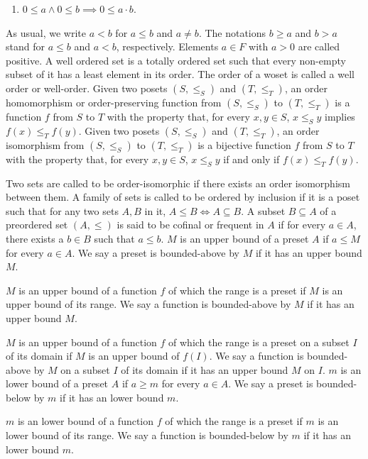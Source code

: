 \documentclass[a4paper,12pt]{article}
\begin{document}
{{{\begin{enumerate}
\item $0\leq a\land 0\leq b\implies 0\leq a\cdot b$.
\end{enumerate}
As usual, we write $a<b$ for $a\leq b$ and $a\neq b$. The notations $b\geq a$ and $b>a$ stand for $a\leq b$ and $a<b$, respectively. Elements $a\in F$ with $a>0$ are called positive.
A well ordered set is a totally ordered set such that every non-empty subset of it has a least element in its order. The order of a woset is called a well order or well-order.
Given two posets $(S,\leq _{S})$ and $(T,\leq _{T})$, an order homomorphism or order-preserving function from $(S,\leq _{S})$ to $(T,\leq _{T})$ is a function $f$ from $S$ to $T$ with the property that, for every $x,y\in S$, $x \leq_S y$ implies $f(x)\leq _{T}f(y)$.
Given two posets $(S,\leq _{S})$ and $(T,\leq _{T})$, an order isomorphism from $(S,\leq _{S})$ to $(T,\leq _{T})$ is a bijective function $f$ from $S$ to $T$ with the property that, for every $x,y\in S$, $x \leq_S y$ if and only if $f(x)\leq _{T}f(y)$.

Two sets are called to be order-isomorphic if there exists an order isomorphism between them.
A family of sets is called to be ordered by inclusion if it is a poset such that for any two sets $A,B$ in it, $A\leq B\iff A\subseteq B$.
A subset $B\subseteq A$ of a preordered set $(A,\leq )$ is said to be cofinal or frequent in $A$ if for every $a\in A$, there exists a $b\in B$ such that $a\leq b$.
$M$ is an upper bound of a preset $A$ if $a\leq M$ for every $a\in A$. We say a preset is bounded-above by $M$ if it has an upper bound $M$.

$M$ is an upper bound of a function $f$ of which the range is a preset if $M$ is an upper bound of its range. We say a function is bounded-above by $M$ if it has an upper bound $M$.

$M$ is an upper bound of a function $f$ of which the range is a preset on a subset $I$ of its domain if $M$ is an upper bound of $f(I)$. We say a function is bounded-above by $M$ on a subset $I$ of its domain if it has an upper bound $M$ on $I$.
$m$ is an lower bound of a preset $A$ if $a\geq m$ for every $a\in A$. We say a preset is bounded-below by $m$ if it has an lower bound $m$.

$m$ is an lower bound of a function $f$ of which the range is a preset if $m$ is an lower bound of its range. We say a function is bounded-below by $m$ if it has an lower bound $m$.

}}}
\end{document}
